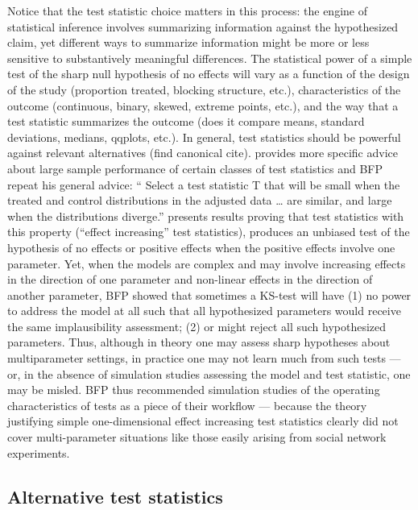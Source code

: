 Notice that the test statistic choice matters in this process: the engine of
statistical inference involves summarizing information against the
hypothesized claim, yet different ways to summarize information might be more
or less sensitive to substantively meaningful differences. The statistical
power of a simple test of the sharp null hypothesis of no effects will vary as
a function of the design of the study (proportion treated, blocking structure,
etc.), characteristics of the outcome (continuous, binary, skewed, extreme
points, etc.), and the way that a test statistic summarizes the outcome (does
it compare means, standard deviations, medians, qqplots, etc.). In general,
test statistics should be powerful against relevant alternatives (find
canonical cite). \citet[\S 2.4.4]{rosenbaum:2002} provides more specific
advice about large sample performance of certain classes of test statistics
and BFP repeat his general advice: `` Select a test statistic T that will be
small when the treated and control distributions in the adjusted data \ldots
are similar, and large when the distributions diverge.'' \citet[Proposition 4
and 5, \S 2.9]{rosenbaum:2002} presents results proving that test statistics
with this property (``effect increasing'' test statistics), produces an
unbiased test of the hypothesis of no effects or positive effects when the
positive effects involve one parameter.  Yet, when the models are complex and
may involve increasing effects in the direction of one parameter and
non-linear effects in the direction of another parameter, BFP showed that
sometimes a KS-test will have (1) no power to address the model at all such
that all hypothesized parameters would receive the same implausibility
assessment; (2) or might reject all such hypothesized parameters. Thus,
although in theory one may assess sharp hypotheses about multiparameter
settings, in practice one may not learn much from such tests --- or, in the
absence of simulation studies assessing the model and test statistic, one may
be misled. BFP thus recommended simulation studies of the operating
characteristics of tests as a piece of their workflow --- because  the theory
justifying simple one-dimensional effect increasing test statistics clearly
did not cover multi-parameter situations like those easily arising from social
network experiments.

\subsection*{Alternative test statistics}

